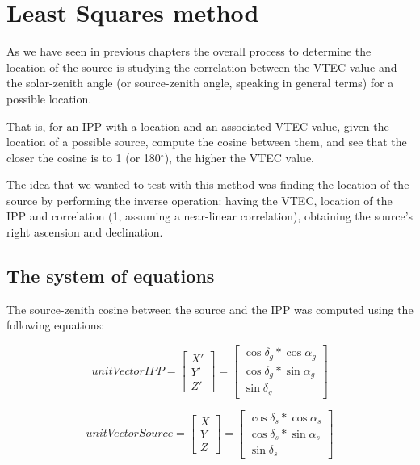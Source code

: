 \chapter{Least Squares method}\label{LSmethodChapter}

As we have seen in previous chapters the overall process to determine the location of the source is studying the correlation between the VTEC value and the solar-zenith angle (or source-zenith angle, speaking in general terms) for a possible location.

That is, for an IPP with a location and an associated VTEC value, given the location of a possible source, compute the cosine between them, and see that the closer the cosine is to 1 (or 180$^{\circ}$), the higher the VTEC value.

The idea that we wanted to test with this method was finding the location of the source by performing the inverse operation: having the VTEC, location of the IPP and correlation (1, assuming a near-linear correlation), obtaining the source's right ascension and declination.

\section{The system of equations}

The source-zenith cosine between the source and the IPP was computed using the following equations:

\begin{equation} \label{eq:61}
unitVectorIPP =
\begin{bmatrix}
X' \\
Y' \\
Z'
\end{bmatrix}
=
\begin{bmatrix}
\cos\delta_{g} * \cos\alpha_{g} \\
\cos\delta_{g} * \sin\alpha_{g} \\
\sin\delta_{g}
\end{bmatrix}
\end{equation}

\begin{equation} \label{eq:62}
unitVectorSource =
\begin{bmatrix}
X \\
Y \\
Z
\end{bmatrix}
=
\begin{bmatrix}
\cos\delta_{s} * \cos\alpha_{s} \\
\cos\delta_{s} * \sin\alpha_{s} \\
\sin\delta_{s}
\end{bmatrix}
\end{equation}

